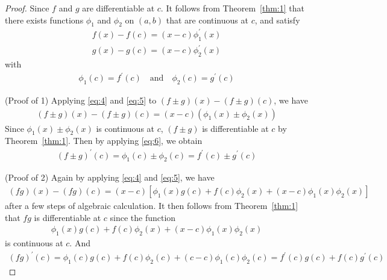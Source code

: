 \documentclass[thmcnt=section, 12pt]{my-elegantbook}
\begin{document}
\begin{proof}
    Since $f$ and $g$ are differentiable at $c$. It follows from Theorem~\ref{thm:1} that there exists functions $\phi_1$ and $\phi_2$ on $(a, b)$ that are continuous at $c$, and satisfy
    \begin{align}
        f(x) - f(c) = (x - c) \phi_1^\prime(x) \label{eq:4}
    \end{align}
    \begin{align}
        g(x) - g(c) = (x - c) \phi_2^\prime(x) \label{eq:5}
    \end{align}
    with
    \begin{align}
        \phi_1 (c) = f^\prime(c)
        \quad \text{and} \quad
        \phi_2 (c) = g^\prime(c)
        \label{eq:6}
    \end{align}

    (Proof of 1) Applying \eqref{eq:4} and \eqref{eq:5} to $(f \pm g)(x) - (f \pm g)(c)$, we have
    \begin{align*}
        (f \pm g)(x) - (f \pm g)(c)
        = (x - c) (
        \phi_1(x) \pm \phi_2(x)
        )
    \end{align*}
    Since $\phi_1(x) \pm \phi_2(x)$ is continuous at $c$, $(f \pm g)$ is differentiable at $c$ by Theorem~\ref{thm:1}. Then by applying \eqref{eq:6}, we obtain
    \begin{align*}
        (f \pm g)^\prime (c)
        = \phi_1(c) \pm \phi_2(c)
        = f^\prime(c) \pm g^\prime(c)
    \end{align*}

    (Proof of 2) Again by applying \eqref{eq:4} and \eqref{eq:5}, we have
    \begin{align*}
        (f g)(x) - (f g)(c)
        = (x - c) [
                \phi_1(x) g(c)
                + f(c) \phi_2(x)
                + (x - c) \phi_1(x) \phi_2(x)
            ]
    \end{align*}
    after a few steps of algebraic calculation. It then follows from Theorem~\ref{thm:1} that $f g$ is differentiable at $c$ since the function
    \begin{align*}
        \phi_1(x) g(c)
        + f(c) \phi_2(x)
        + (x - c) \phi_1(x) \phi_2(x)
    \end{align*}
    is continuous at $c$. And
    \begin{align*}
        (f g)^\prime (c)
        = \phi_1(c) g(c)
        + f(c) \phi_2(c)
        + (c - c) \phi_1(c) \phi_2(c)
        = f^\prime(c) g(c) + f(c) g^\prime(c)
    \end{align*}


\end{proof}
\end{document}
